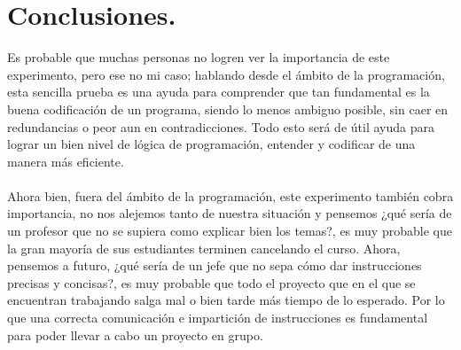 \documentclass{article}
\begin{document}
\section{Conclusiones.} \label{imagenes}
Es probable que muchas personas no logren ver la importancia de este experimento, pero ese no mi caso; hablando desde el ámbito de la programación, esta sencilla prueba es una ayuda para comprender que tan fundamental es la buena codificación de un programa, siendo lo menos ambiguo posible, sin caer en redundancias o peor aun en contradicciones. Todo esto será de útil ayuda para lograr un bien nivel de lógica de programación, entender y codificar de una manera más eficiente.
\\
\\
Ahora bien, fuera del ámbito de la programación, este experimento también cobra importancia, no nos alejemos tanto de nuestra situación y pensemos ¿qué sería de un profesor que no se supiera como explicar bien los temas?, es muy probable que la gran mayoría de sus estudiantes terminen cancelando el curso. Ahora, pensemos a futuro, ¿qué sería de un jefe que no sepa cómo dar instrucciones precisas y concisas?, es muy probable que todo el proyecto que en el que se encuentran trabajando salga mal o bien tarde más tiempo de lo esperado. Por lo que una correcta comunicación e impartición de instrucciones es fundamental para poder llevar a cabo un proyecto en grupo.
\end{document}
